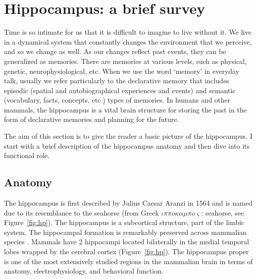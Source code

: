 \section{Hippocampus: a brief survey}
\label{sec:hippo}
  Time is so intimate for us that it is difficult to imagine to live without
  it. We live in a dynamical system that constantly changes the environment
  that we perceive, and so we change as well. As our changes reflect past
  events, they can be generalized as memories. There are memories at various
  levels, such as physical, genetic, neurophysiological, etc. When we use the
  word `memory' in everyday talk, usually we refer particularly to the
  declarative memory that includes episodic (spatial and autobiographical
  experiences and events) and semantic (vocabulary, facts, concepts, etc.)
  types of memories.  In humans and other mammals, the hippocampus is a vital
  brain structure for storing the past in the form of declarative memories and
  planning for the future.

  The aim of this section is to give the reader a basic picture of the
  hippocampus. I start with a brief description of the hippocampus anatomy and
  then dive into its functional role.

  \subsection{Anatomy}
    The hippocampus is first described by Julius Caesar Aranzi in 1564 and is
    named due to its resemblance to the seahorse (from Greek $\iota \pi \pi o
    \kappa \alpha \mu \pi o \varsigma$: seahorse, see Figure~\ref{fig:hp}). The
    hippocampus is a subcortical structure, part of the limbic system. The
    hippocampal formation is remarkably preserved across mammalian species
    \citep{Manns2006, Clark2013}. Mammals have 2 hippocampi located bilaterally
    in the medial temporal lobes wrapped by the cerebral cortex
    (Figure~\ref{fig:hp}). The hippocampus proper is one of the most
    extensively studied regions in the mammalian brain in terms of anatomy,
    electrophysiology, and behavioral function.

